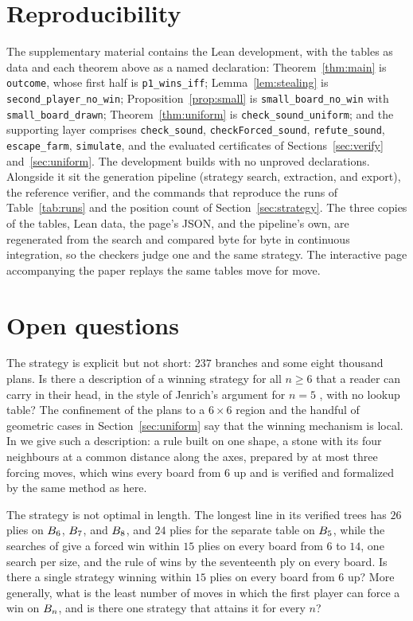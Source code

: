 \documentclass[11pt]{amsart}
\theoremstyle{definition}
\theoremstyle{remark}
\begin{document}
\section{Reproducibility}\label{sec:repro}

The supplementary material contains the Lean development, with the
tables as data and each theorem above as a named declaration:
Theorem~\ref{thm:main} is \texttt{outcome}, whose first half is
\texttt{p1\_wins\_iff}; Lemma~\ref{lem:stealing} is
\texttt{second\_player\_no\_win}; Proposition~\ref{prop:small} is
\texttt{small\_board\_no\_win} with \texttt{small\_board\_drawn};
Theorem~\ref{thm:uniform} is \texttt{check\_sound\_uniform}; and the
supporting layer comprises \texttt{check\_sound},
\texttt{checkForced\_sound}, \texttt{refute\_sound},
\texttt{escape\_farm}, \texttt{simulate}, and the evaluated
certificates of Sections~\ref{sec:verify} and~\ref{sec:uniform}. The
development builds with no unproved declarations. Alongside it sit
the generation pipeline (strategy search, extraction, and export),
the reference verifier, and the commands that reproduce the runs of
Table~\ref{tab:runs} and the position count of
Section~\ref{sec:strategy}. The three copies of the tables, Lean
data, the page's JSON, and the pipeline's own, are regenerated from
the search and compared byte for byte in continuous integration, so
the checkers judge one and the same strategy. The interactive page
accompanying the paper replays the same tables move for move.

\section{Open questions}\label{sec:open}

The strategy is explicit but not short: $237$ branches and some eight
thousand plans. Is there a description of a winning strategy for all
$n \ge 6$ that a reader can carry in their head, in the style of
Jenrich's argument for $n = 5$ \cite{jenrich}, with no lookup table?
The confinement of the plans to a $6 \times 6$ region and the handful
of geometric cases in Section~\ref{sec:uniform} say that the winning
mechanism is local. In \cite{reid-plus} we give such a description: a
rule built on one shape, a stone with its four neighbours at a common
distance along the axes, prepared by at most three forcing moves, which
wins every board from $6$ up and is verified and formalized by the
same method as here.

The strategy is not optimal in length. The longest line in its
verified trees has $26$ plies on $B_6$, $B_7$, and
$B_8$, and $24$ plies for the separate table on $B_5$,
while the searches of \cite{adler} give a forced win within $15$
plies on every board from $6$ to $14$, one search per size, and the
rule of \cite{reid-plus} wins by the seventeenth ply on every board.
Is there a single strategy winning within $15$ plies on every board
from $6$ up? More generally, what is the least number of moves in which the
first player can force a win on $B_n$, and is there one strategy
that attains it for every $n$?
\end{document}
